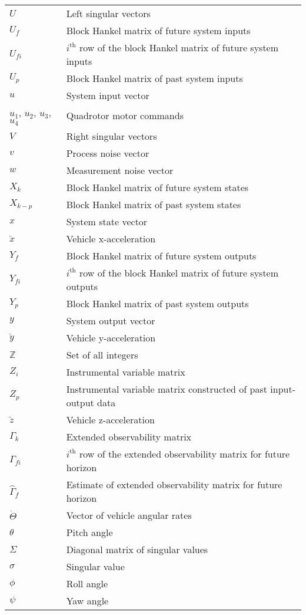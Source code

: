 {\begin{longtable}{p{7em}p{26em}}
$U$					& Left singular vectors\\
$U_f$				& Block Hankel matrix of future system inputs\\
$U_{fi}$			& $i^{\mbox{th}}$ row of the block Hankel matrix of future system inputs\\
$U_p$				& Block Hankel matrix of past system inputs\\
$u$					& System input vector\\
$u_1$, $u_2$, $u_3$, $u_4$	& Quadrotor motor commands\\
$V$					& Right singular vectors\\
$v$					& Process noise vector\\
$w$					& Measurement noise vector\\
$X_k$				& Block Hankel matrix of future system states\\
$X_{k-p}$			& Block Hankel matrix of past system states\\
$x$					& System state vector\\
$\ddot x$			& Vehicle x-acceleration \\
$Y_f$				& Block Hankel matrix of future system outputs\\
$Y_{fi}$			& $i^{\mbox{th}}$ row of the block Hankel matrix of future system outputs\\
$Y_p$				& Block Hankel matrix of past system outputs\\
$y$					& System output vector\\
$\ddot y$			& Vehicle y-acceleration \\
$\mathbb{Z}$ 		& Set of all integers\\
$Z_i$				& Instrumental variable matrix\\
$Z_p$				& Instrumental variable matrix constructed of past input-output data\\
$\ddot z$			& Vehicle z-acceleration \\


$\Gamma_k$			& Extended observability matrix\\
$\Gamma_{fi}$		& $i^{\mbox{th}}$ row of the extended observability matrix for future horizon\\
$\hat{\Gamma}_f$	& Estimate of extended observability matrix for future horizon\\
$\dot \Theta$		& Vector of vehicle angular rates \\
$\theta$					& Pitch angle\\
$\Sigma$			& Diagonal matrix of singular values\\
$\sigma$			& Singular value\\
$\phi$						& Roll angle\\
$\psi$						& Yaw angle\\
\end{longtable}

}